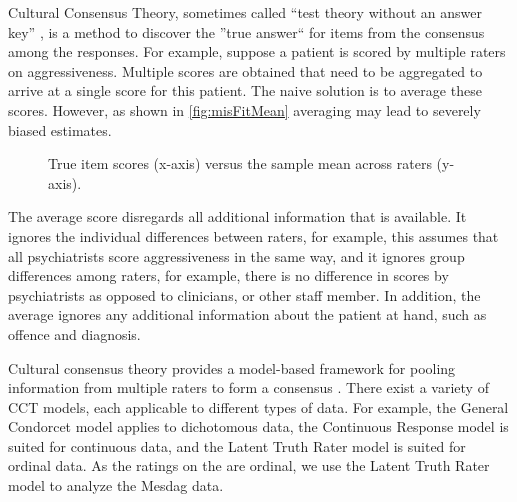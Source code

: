 \documentclass[a4paper,11pt]{article}
\begin{document}
Cultural Consensus Theory, sometimes called ``test theory without an answer key'' \parencite{batchelder1988test}, is a method to discover the ''true answer`` for items from the consensus among the responses.
For example, suppose a patient is scored by multiple raters on aggressiveness.
Multiple scores are obtained that need to be aggregated to arrive at a single score for this patient.
The naive solution is to average these scores.
However, as shown in \autoref{fig:misFitMean} averaging may lead to severely biased estimates.
\begin{figure}[!ht]
	\centering
	
	\caption{True item scores (x-axis) versus the sample mean across raters (y-axis).}
	\label{fig:misFitMean}
\end{figure}
The average score disregards all additional information that is available.
It ignores the individual differences between raters, for example, this assumes that all psychiatrists score aggressiveness in the same way, and it ignores group differences among raters, for example, there is no difference in scores by psychiatrists as opposed to clinicians, or other staff member.
In addition, the average ignores any additional information about the patient at hand, such as offence and diagnosis.

Cultural consensus theory provides a model-based framework for pooling information from multiple raters to form a consensus \parencite{anders2014cultural}.
There exist a variety of CCT models, each applicable to different types of data.
For example, the General Condorcet model \parencite{Batchelder1986statistical} applies to dichotomous data, the Continuous Response model \parencite{anders2014cultural} is suited for continuous data, and the Latent Truth Rater model \parencite{Anders2015cultural} is suited for ordinal data.
As the ratings on the are ordinal, we use the Latent Truth Rater model to analyze the Mesdag data.
\end{document}
